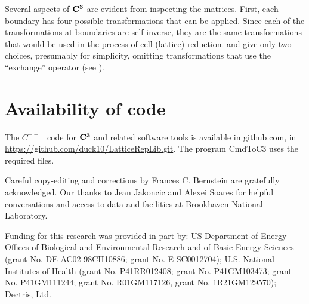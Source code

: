 \documentclass[]{iucr}              %
\numberwithin{equation}{section}
\newcommand{\CIII}[0]{$\bf{C^{3}}$}
\begin{document}
	Several aspects of \CIII{} are evident from inspecting the matrices. 
	First, each boundary has four possible 
	transformations that can be applied. Since each of 
	the transformations at boundaries are self-inverse, they are the 
	same transformations that would be used in the process of 
	cell (lattice) reduction.  and  give only two choices, presumably for simplicity, 
	omitting transformations that use the ``exchange'' operator 
	(see ).
	
	
	
	
	
	
	\section{Availability of code}
	
	The $C^{++}$ ~code for \CIII{} and related 
	software tools is available in github.com, in
	\url{https://github.com/duck10/LatticeRepLib.git}.
	The program CmdToC3 uses the required files.
	
	
	
	
	Careful copy-editing and corrections by Frances C. Bernstein are 
	gratefully acknowledged.
	Our thanks to Jean Jakoncic and Alexei Soares for 
	helpful conversations and access to data and facilities at 
	Brookhaven National Laboratory.
	
	
	Funding for this research was provided in part by:  
	US Department of Energy Offices of Biological and 
	Environmental Research and of Basic Energy Sciences 
	(grant No. DE-AC02-98CH10886; grant No. E-SC0012704); 
	U.S. National Institutes of Health (grant No. P41RR012408; 
	grant No. P41GM103473; grant No. P41GM111244; 
	grant No. R01GM117126,
	grant No. 1R21GM129570); Dectris, Ltd.
	
	
	
	
	
	
	
	
	
\end{document}
